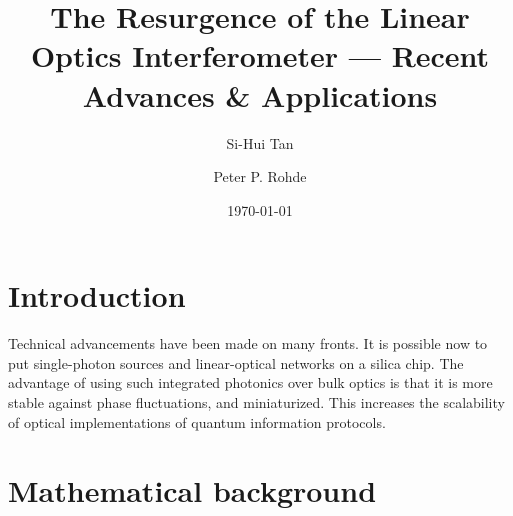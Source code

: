 \documentclass[aps,rmp,twocolumn,amsmath,amssymb,nofootinbib,superscriptaddress]{revtex4}
\newcommand{\sihui}[1]{{\color{Orchid}{#1}}}
\newcommand{\peter}[1]{{\color{YellowGreen}{#1}}}
\newcommand{\comment}[1]{{\color{blue}{#1}}}
\begin{document}


%
%

\title{The Resurgence of the Linear Optics Interferometer --- Recent Advances \& Applications}

%
%

\author{Si-Hui Tan}

\author{Peter P. Rohde}

\date{\today}

\frenchspacing

%
%

\begin{abstract}
\end{abstract}

\maketitle

\tableofcontents

\section{Introduction}

\sihui{Si-Hui can colour code things she adds like this}

\peter{And Peter can do it like this}

\comment{Let's add comments and questions like this}

Technical advancements have been made on many fronts. It is possible now to put single-photon sources and linear-optical networks on a silica chip. The advantage of using such integrated photonics over bulk optics is that it is more stable against phase fluctuations, and miniaturized. This increases the scalability of optical implementations of quantum information protocols.


\section{Mathematical background}
\comment{Mathematical representation for LO networks, and very basic background on quantum optics}\\
\end{document}
